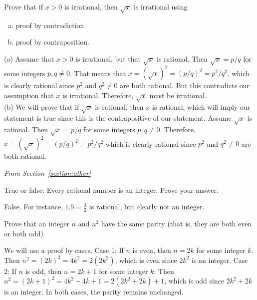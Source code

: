 {{\begin{requ}
Prove that if $x>0$ is irrational, then $\sqrt{x}$ is irrational using
\begin{enumerate}[(a)]
\item proof by contradiction.
\item proof by contraposition.
\end{enumerate}
\begin{requanswer}
(a) Assume that $x>0$ is irrational, but that $\sqrt{x}$ is rational.
Then $\sqrt{x}=p/q$ for some integers $p, q\neq 0$.
That means that $x=(\sqrt{x})^2=(p/q)^2=p^2/q^2$, which 
is clearly rational since $p^2$ and $q^2\neq 0$ are both rational.
But this contradicts our assumption that $x$ is irrational.
Therefore, $\sqrt{x}$ must be irrational.\\
(b) We will prove that if $\sqrt{x}$ is rational, then $x$ is rational,
which will imply our statement is true since this is the
contrapositive of our statement.
Assume $\sqrt{x}$ is rational. Then 
$\sqrt{x}=p/q$ for some integers $p, q\neq 0$.
Therefore, $x=(\sqrt{x})^2=(p/q)^2=p^2/q^2$
which is clearly rational since $p^2$ and $q^2\neq 0$ are both rational.
\end{requanswer}
\end{requ}



\medskip
 
\noindent
{\em From Section~\ref{section:other}}

\begin{requ}
True or false: Every rational number is an integer. Prove your answer.
\begin{requanswer}
False. For instance, $1.5=\frac{3}{2}$ is rational, but clearly not an integer.
\end{requanswer}
\end{requ}

\begin{requ}
Prove that an integer $n$ and $n^2$ have the same parity
(that is, they are both even or both odd).
\begin{requanswer}
We will use a proof by cases.
Case 1: If $n$ is even, then $n=2k$ for some integer $k$.
Then $n^2=(2k)^2=4k^2=2(2k^2)$, which is even since
$2k^2$ is an integer.
Case 2: If $n$ is odd, then $n=2k+1$ for some integer $k$.
Then $n^2=(2k+1)^2=4k^2+4k+1=2(2k^2+2k)+1$, which is odd since $2k^2+2k$ is an integer.
In both cases, the parity remains unchanged.
\end{requanswer}
\end{requ}

}}
